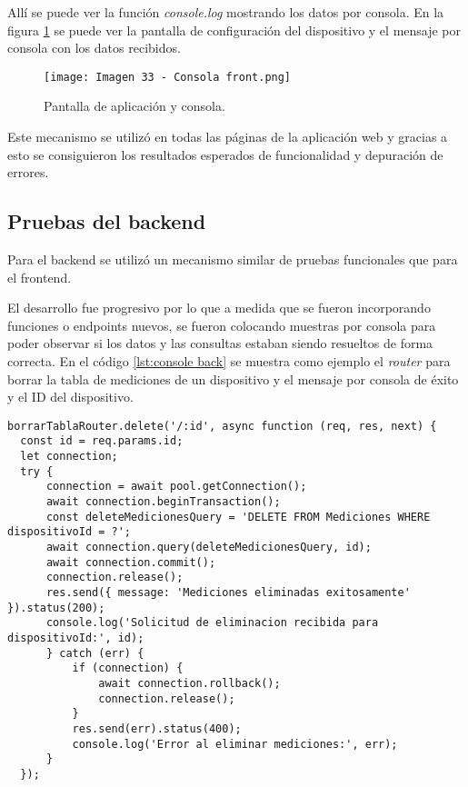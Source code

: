 Allí se puede ver la función \textit{console.log} mostrando los datos por consola. En la figura \ref{fig:33} se puede ver la pantalla de configuración del dispositivo y el mensaje por consola con los datos recibidos.

\begin{figure}[h]
\centering
\texttt{[image: Imagen 33 - Consola front.png]}
\caption[Prueba frontend]{Pantalla de aplicación y consola.}
\label{fig:33}
\end{figure}

Este mecanismo se utilizó en todas las páginas de la aplicación web y gracias a esto se consiguieron los resultados esperados de funcionalidad y depuración de errores.

\subsection{Pruebas del backend}

Para el backend se utilizó un mecanismo similar de pruebas funcionales que para el frontend.

El desarrollo fue progresivo por lo que a medida que se fueron incorporando funciones o endpoints nuevos, se fueron colocando muestras por consola para poder observar si los datos y las consultas estaban siendo resueltos de forma correcta. En el código \ref{lst:console back} se muestra como ejemplo el \textit{router} para borrar la tabla de mediciones de un dispositivo y el mensaje por consola de éxito y el ID del dispositivo.

\begin{lstlisting}[caption={Muestra por consola de los datos consultados}, label={lst:console back}]
borrarTablaRouter.delete('/:id', async function (req, res, next) {
  const id = req.params.id;
  let connection;
  try {
      connection = await pool.getConnection();
      await connection.beginTransaction();
      const deleteMedicionesQuery = 'DELETE FROM Mediciones WHERE dispositivoId = ?';
      await connection.query(deleteMedicionesQuery, id);
      await connection.commit();
      connection.release();
      res.send({ message: 'Mediciones eliminadas exitosamente' }).status(200);
      console.log('Solicitud de eliminacion recibida para dispositivoId:', id);
      } catch (err) {
          if (connection) {
              await connection.rollback();
              connection.release();
          }
          res.send(err).status(400);
          console.log('Error al eliminar mediciones:', err);
      }
  });
\end{lstlisting}

